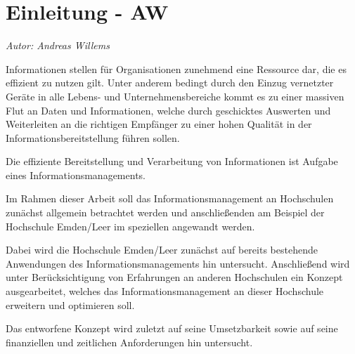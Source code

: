 \chapter{Einleitung - AW}
\textit{Autor: Andreas Willems}

Informationen stellen für Organisationen zunehmend eine Ressource dar, die es effizient zu nutzen gilt.
Unter anderem bedingt durch den Einzug vernetzter Geräte in alle Lebens- und Unternehmensbereiche kommt es zu einer massiven Flut
an Daten und Informationen, welche durch geschicktes Auswerten und Weiterleiten an die richtigen Empfänger zu einer hohen 
Qualität in der Informationsbereitstellung führen sollen.

Die effiziente Bereitstellung und Verarbeitung von Informationen ist Aufgabe eines Informationsmanagements.

Im Rahmen dieser Arbeit soll das Informationsmanagement an Hochschulen zunächst allgemein betrachtet werden und
anschließenden am Beispiel der Hochschule Emden/Leer im speziellen angewandt werden.

Dabei wird die Hochschule Emden/Leer zunächst auf bereits bestehende Anwendungen des Informationsmanagements hin
untersucht. Anschließend wird unter Berücksichtigung von Erfahrungen an anderen Hochschulen ein Konzept ausgearbeitet,
welches das Informationsmanagement an dieser Hochschule erweitern und optimieren soll.

Das entworfene Konzept wird zuletzt auf seine Umsetzbarkeit sowie auf seine finanziellen und zeitlichen Anforderungen hin
untersucht.

